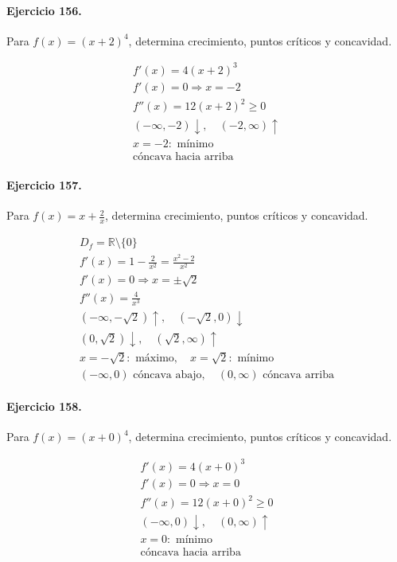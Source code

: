 \documentclass[11pt,a4paper]{article}
\begin{document}
\paragraph{Ejercicio 156.} Para $f(x)=(x+2)^4$, determina crecimiento, puntos críticos y concavidad.

\[
\begin{aligned}
f'(x)=4(x+2)^3\\
f'(x)=0\Rightarrow x=-2\\
f''(x)=12(x+2)^2\ge0\\
(-\infty,-2)\downarrow,\quad(-2,\infty)\uparrow\\
x=-2:\text{ mínimo}\\
\text{{cóncava hacia arriba}}
\end{aligned}
\]


\paragraph{Ejercicio 157.} Para $f(x)=x+\frac{2}{x}$, determina crecimiento, puntos críticos y concavidad.

\[
\begin{aligned}
D_f=\mathbb{R}\setminus\{0\}\\
f'(x)=1-\frac{2}{x^2}=\frac{x^2-2}{x^2}\\
f'(x)=0\Rightarrow x=\pm \sqrt{2}\\
f''(x)=\frac{4}{x^3}\\
(-\infty,-\sqrt{2})\uparrow,\quad(-\sqrt{2},0)\downarrow\\
(0,\sqrt{2})\downarrow,\quad(\sqrt{2},\infty)\uparrow\\
x=-\sqrt{2}:\text{ máximo},\quad x=\sqrt{2}:\text{ mínimo}\\
(-\infty,0)\text{{ cóncava abajo}},\quad(0,\infty)\text{{ cóncava arriba}}
\end{aligned}
\]


\paragraph{Ejercicio 158.} Para $f(x)=(x+0)^4$, determina crecimiento, puntos críticos y concavidad.

\[
\begin{aligned}
f'(x)=4(x+0)^3\\
f'(x)=0\Rightarrow x=0\\
f''(x)=12(x+0)^2\ge0\\
(-\infty,0)\downarrow,\quad(0,\infty)\uparrow\\
x=0:\text{ mínimo}\\
\text{{cóncava hacia arriba}}
\end{aligned}
\]
\end{document}
